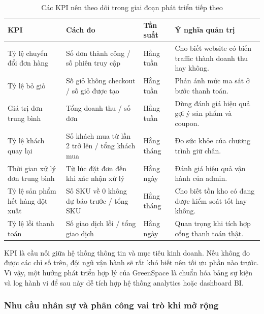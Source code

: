 \documentclass[11pt, a4paper]{article}
\begin{document}
\begin{table}[H]
    \centering
    \caption{Các KPI nên theo dõi trong giai đoạn phát triển tiếp theo}
    \label{tab:kpi-roadmap}
    \begin{tabularx}{\linewidth}{|>{\raggedright\arraybackslash}p{4.3cm}
                                  |>{\raggedright\arraybackslash}p{3.6cm}
                                  |>{\centering\arraybackslash}p{2.2cm}
                                  |Y|}
        \hline
        \textbf{KPI} & \textbf{Cách đo} & \textbf{Tần suất} & \textbf{Ý nghĩa quản trị} \\ \hline
        Tỷ lệ chuyển đổi đơn hàng & Số đơn thành công / số phiên truy cập & Hằng tuần & Cho biết website có biến traffic thành doanh thu hay không. \\ \hline
        Tỷ lệ bỏ giỏ & Số giỏ không checkout / số giỏ được tạo & Hằng tuần & Phản ánh mức ma sát ở bước thanh toán. \\ \hline
        Giá trị đơn trung bình & Tổng doanh thu / số đơn & Hằng tuần & Dùng đánh giá hiệu quả gợi ý sản phẩm và coupon. \\ \hline
        Tỷ lệ khách quay lại & Số khách mua từ lần 2 trở lên / tổng khách mua & Hằng tháng & Đo sức khỏe của chương trình giữ chân. \\ \hline
        Thời gian xử lý đơn trung bình & Từ lúc đặt đơn đến khi xác nhận xử lý & Hằng ngày & Đánh giá hiệu quả vận hành của admin. \\ \hline
        Tỷ lệ sản phẩm hết hàng đột xuất & Số SKU về 0 không dự báo trước / tổng SKU & Hằng tháng & Cho biết tồn kho có đang được kiểm soát tốt hay không. \\ \hline
        Tỷ lệ lỗi thanh toán & Số giao dịch lỗi / tổng giao dịch & Hằng ngày & Quan trọng khi tích hợp cổng thanh toán thật. \\ \hline
    \end{tabularx}
\end{table}

KPI là cầu nối giữa hệ thống thông tin và mục tiêu kinh doanh. Nếu không đo được các
chỉ số trên, đội ngũ vận hành sẽ rất khó biết nên tối ưu phần nào trước. Vì vậy, một
hướng phát triển hợp lý của GreenSpace là chuẩn hóa bảng sự kiện và log hành vi để sau
này dễ tích hợp hệ thống analytics hoặc dashboard BI.

\subsubsection{Nhu cầu nhân sự và phân công vai trò khi mở rộng}
\end{document}
